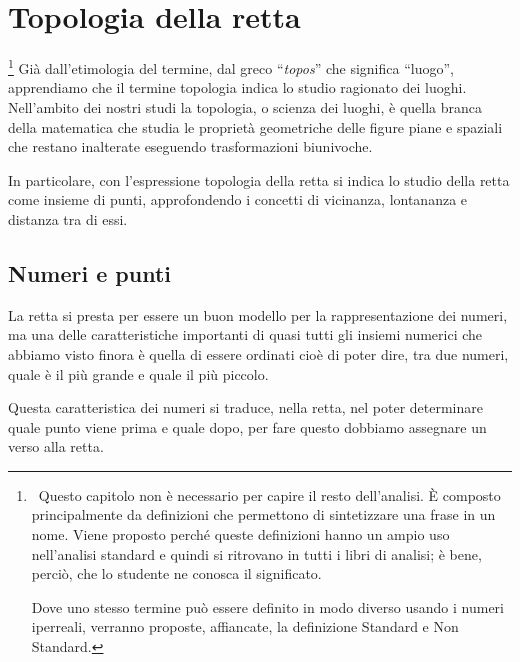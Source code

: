 


\chapter{Topologia della retta}

\footnote{~Questo capitolo non è necessario per capire il resto 
dell'analisi.
È composto principalmente da definizioni che permettono di sintetizzare una 
frase in un nome.
Viene proposto perché queste definizioni hanno un ampio uso nell'analisi 
standard e quindi si ritrovano in tutti i libri di analisi; 
è bene, perciò, che lo studente ne conosca il significato.

Dove uno stesso termine può essere definito in modo diverso 
usando i numeri iperreali, verranno proposte, affiancate, la definizione 
Standard e Non Standard.}
Già dall'etimologia del termine, dal greco ``\emph{topos}'' che significa 
``luogo'', apprendiamo che il termine topologia indica lo studio 
ragionato dei luoghi. 
Nell'ambito dei nostri studi la topologia, o scienza dei luoghi, 
è quella branca della matematica che studia le proprietà geometriche 
delle figure piane e spaziali che restano inalterate eseguendo 
trasformazioni biunivoche. 

In particolare, con l'espressione topologia della retta si indica 
lo studio della retta come insieme di punti, approfondendo i concetti di 
vicinanza, lontananza e distanza tra di essi.

\section{Numeri e punti}
\label{sec:topologianumeripunti}

La retta si presta per essere un buon modello per la rappresentazione dei 
numeri, ma una delle caratteristiche importanti di quasi tutti gli insiemi 
numerici che abbiamo visto finora è quella di essere ordinati cioè di poter 
dire, tra due numeri, quale è il più grande e quale il più piccolo.

Questa caratteristica dei numeri si traduce, nella retta, nel poter 
determinare quale punto viene prima e quale dopo, 
per fare questo dobbiamo assegnare un verso alla retta.


